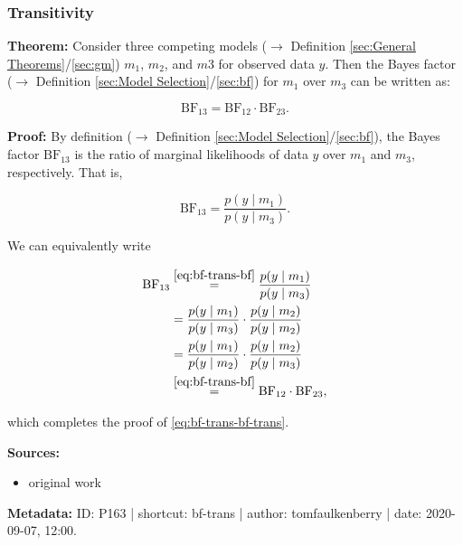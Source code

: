 \documentclass[a4paper,12pt,twoside]{book}
\begin{document}
\subsubsection[\textbf{Transitivity}]{Transitivity} \label{sec:bf-trans}
\setcounter{equation}{0}

\textbf{Theorem:} Consider three competing models ($\rightarrow$ Definition \ref{sec:General Theorems}/\ref{sec:gm}) $m_1$, $m_2$, and $m3$ for observed data $y$. Then the Bayes factor ($\rightarrow$ Definition \ref{sec:Model Selection}/\ref{sec:bf}) for $m_1$ over $m_3$ can be written as:

\begin{equation} \label{eq:bf-trans-bf-trans}
\text{BF}_{13} = \text{BF}_{12}\cdot \text{BF}_{23}.
\end{equation}

\vspace{1em}
\textbf{Proof:} By definition ($\rightarrow$ Definition \ref{sec:Model Selection}/\ref{sec:bf}), the Bayes factor $\text{BF}_{13}$ is the ratio of marginal likelihoods of data $y$ over $m_1$ and $m_3$, respectively. That is,

\begin{equation} \label{eq:bf-trans-bf}
\text{BF}_{13}=\frac{p(y \mid m_1)}{p(y \mid m_3)}.
\end{equation}

We can equivalently write 

\begin{equation}
\begin{split}
  \text{BF}_{13} &\overset{\eqref{eq:bf-trans-bf}}{=} \frac{p(y \mid m_1)}{p(y \mid m_3)}\\
  &= \frac{p(y \mid m_1)}{p(y \mid m_3)} \cdot \frac{p(y \mid m_2)}{p(y \mid m_2)}\\
  &=\frac{p(y \mid m_1)}{p(y \mid m_2)} \cdot \frac{p(y \mid m_2)}{p(y \mid m_3)}\\
  &\overset{\eqref{eq:bf-trans-bf}}{=}\text{BF}_{12} \cdot \text{BF}_{23},
\end{split}
\end{equation}

which completes the proof of \eqref{eq:bf-trans-bf-trans}.


\vspace{1em}
\textbf{Sources:}
\begin{itemize}
\item original work\end{itemize}


\vspace{1em}
\textbf{Metadata:} ID: P163 | shortcut: bf-trans | author: tomfaulkenberry | date: 2020-09-07, 12:00.
\vspace{1em}
\end{document}

